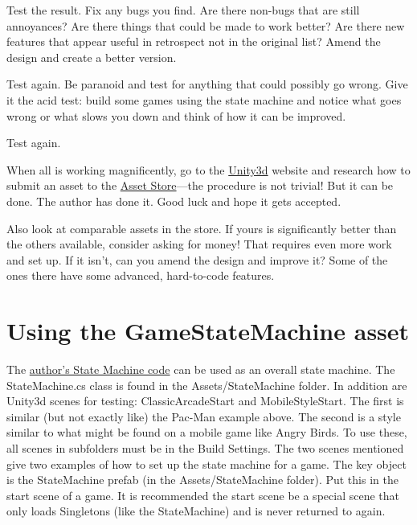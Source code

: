 Test the result. Fix any bugs you find. Are there non-bugs that are
still annoyances? Are there things that could be made to work better?
Are there new features that appear useful in retrospect not in the
original list? Amend the design and create a better version.

Test again. Be paranoid and test for anything that could possibly go
wrong. Give it the acid test: build some games using the state machine
and notice what goes wrong or what slows you down and think of how it
can be improved.

Test again.

When all is working magnificently, go to the
\href{https://unity3d.com/}{Unity3d} website and research how to submit
an asset to the \href{https://www.assetstore.unity3d.com/en/}{Asset
Store}---the procedure is not trivial! But it can be done. The author
has done it. Good luck and hope it gets accepted.

Also look at comparable assets in the store. If yours is significantly
better than the others available, consider asking for money! That
requires even more work and set up. If it isn't, can you amend the
design and improve it? Some of the ones there have some advanced,
hard-to-code features.

\section[Using the GameStateMachine
asset]{\texorpdfstring{\protect\hypertarget{anchor-16}{}{}Using the
GameStateMachine
asset}{Using the GameStateMachine asset}}\label{using-the-gamestatemachine-asset}

The \href{https://github.com/tdvance/GameStateMachine}{author's State
Machine code} can be used as an overall state machine. The
StateMachine.cs class is found in the Assets/StateMachine folder. In
addition are Unity3d scenes for testing: ClassicArcadeStart and
MobileStyleStart. The first is similar (but not exactly like) the
Pac-Man example above. The second is a style similar to what might be
found on a mobile game like Angry Birds. To use these, all scenes in
subfolders must be in the Build Settings. The two scenes mentioned give
two examples of how to set up the state machine for a game. The key
object is the StateMachine prefab (in the Assets/StateMachine folder).
Put this in the start scene of a game. It is recommended the start scene
be a special scene that only loads Singletons (like the StateMachine)
and is never returned to again.

